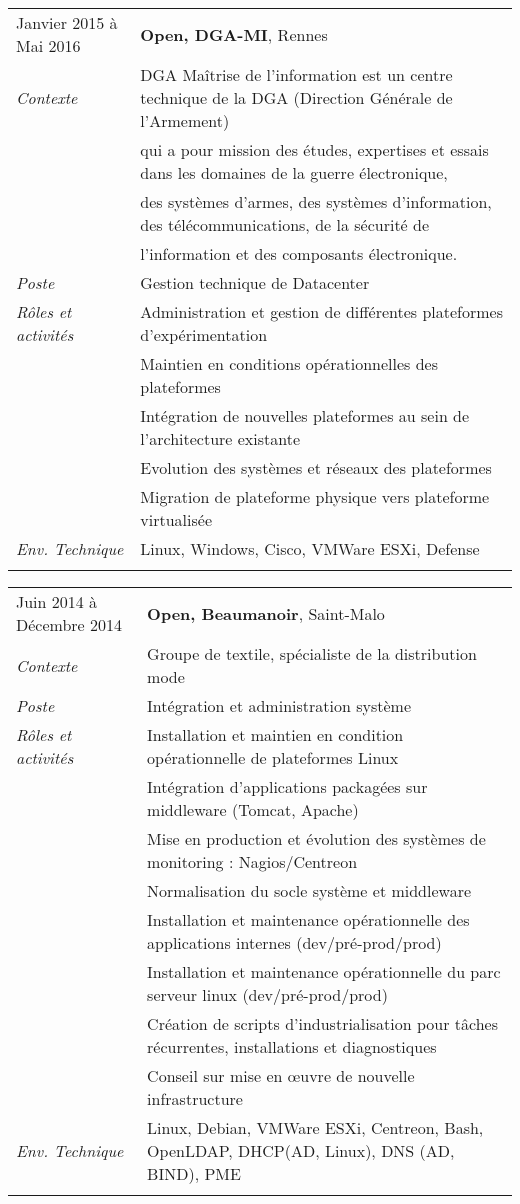 \documentclass[a4paper]{article}
\begin{document}
\begin{tabular}{P{3.5cm}|p{13cm}}
Janvier 2015 à Mai 2016		& \textbf{Open, DGA-MI}, Rennes\\
\textsl{Contexte}      		& DGA Maîtrise de l'information est un centre technique de la DGA (Direction Générale de l'Armement)\\
				& qui a pour mission des études, expertises et essais dans les domaines de la guerre électronique,\\
				& des systèmes d'armes, des systèmes d'information, des télécommunications, de la sécurité de \\
				& l'information et des composants électronique.\\
\textsl{Poste}			& Gestion technique de Datacenter\\
\textsl{Rôles et activités}	& Administration et gestion de différentes plateformes d'expérimentation\\
				& Maintien en conditions opérationnelles des plateformes\\
				& Intégration de nouvelles plateformes au sein de l'architecture existante\\
				& Evolution des systèmes et réseaux des plateformes\\
				& Migration de plateforme physique vers plateforme virtualisée\\
\textsl{Env. Technique}		& Linux, Windows, Cisco, VMWare ESXi, Defense\\
 & \\
\end{tabular}

\begin{tabular}{P{3.5cm}|p{13cm}}
Juin 2014 à Décembre 2014	& \textbf{Open, Beaumanoir}, Saint-Malo\\
\textsl{Contexte}		& Groupe de textile, spécialiste de la distribution mode\\
\textsl{Poste}			& Intégration et administration système\\
\textsl{Rôles et activités}	& Installation et maintien en condition opérationnelle de plateformes Linux\\
				& Intégration d'applications packagées sur middleware (Tomcat, Apache)\\
				& Mise en production et évolution des systèmes de monitoring : Nagios/Centreon\\
				& Normalisation du socle système et middleware\\
				& Installation et maintenance opérationnelle des applications internes (dev/pré-prod/prod)\\
				& Installation et maintenance opérationnelle du parc serveur linux (dev/pré-prod/prod)\\
				& Création de scripts d'industrialisation pour tâches récurrentes, installations et diagnostiques\\
				& Conseil sur mise en œuvre de nouvelle infrastructure\\
\textsl{Env. Technique}		& Linux, Debian, VMWare ESXi, Centreon, Bash, OpenLDAP, DHCP(AD, Linux), DNS (AD, BIND), PME\\
 & \\
\end{tabular}
\end{document}
